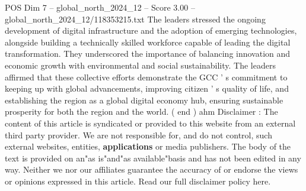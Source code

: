 \begin{textsample}{POS Dim 7 – global\_north\_2024\_12 – Score 3.00 – global\_north\_2024\_12/118353215.txt}
The leaders stressed the ongoing development of digital infrastructure and the adoption of emerging technologies, alongside building a technically skilled workforce capable of leading the digital transformation.
They underscored the importance of balancing innovation and economic growth with environmental and social sustainability.
The leaders affirmed that these collective efforts demonstrate the GCC ' s commitment to keeping up with global advancements, improving citizen ' s quality of life, and establishing the region as a global digital economy hub, ensuring sustainable prosperity for both the region and the world. ( end ) ahm Disclaimer : The content of this article is syndicated or provided to this website from an external third party provider.
We are not responsible for, and do not control, such external websites, entities, \textbf{applications} or media publishers.
The body of the text is provided on an"as is"and"as available"basis and has not been edited in any way.
Neither we nor our affiliates guarantee the accuracy of or endorse the views or opinions expressed in this article.
Read our full disclaimer policy here.

\end{textsample}
